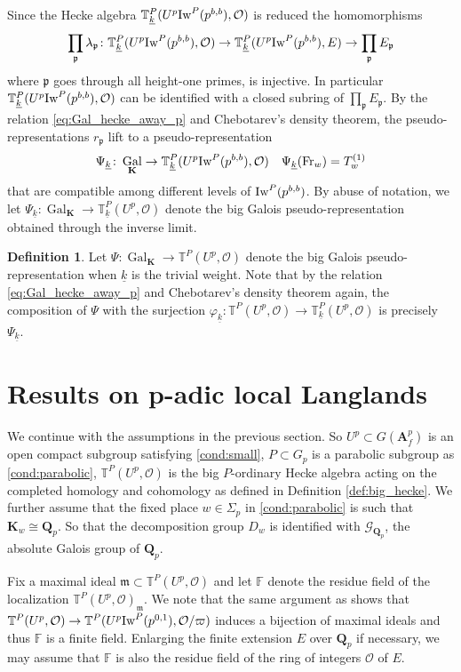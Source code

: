 \documentclass[leqno]{amsart}
\theoremstyle{definition}
\newtheorem{defn}[thm]{Definition}
\theoremstyle{remark}
\newcommand{\oo}{\mathcal{O}}
\newcommand{\fF}{\mathbb{F}} %
\newcommand{\Qp}{\mathbf{Q}_p}
\newcommand{\A}{\mathbf A}
\DeclareMathOperator{\Gal}{Gal}
\newcommand{\Fr}{\textnormal{Fr}} %
\newcommand{\fm}{\mathfrak{m}}
\newcommand{\fp}{\mathfrak{p}}
\newcommand{\Gp}{\mathcal{G}_{\Qp}} %
\newcommand{\K}{{\mathbf{K}}} %
\newcommand{\wt}[1]{\underline{ #1 }}
\newcommand{\Iw}{\textnormal{Iw}} %
\newcommand{\TT}{\mathbb{T}} %
\begin{document}
Since the Hecke algebra 
$\TT^P_{\wt{k}}(U^p\Iw^P(p^{b,b}),\oo)$
is reduced the homomorphisms
\[
	\prod_{\fp}\lambda_{\fp}\colon 
	\TT^P_{\wt{k}}(U^p\Iw^P(p^{b,b}),\oo)\to 
	\TT^P_{\wt{k}}(U^p\Iw^P(p^{b,b}),E)\to  
	\prod_{\fp}E_{\fp}
\]
where $\fp$ goes through all height-one primes,
is injective.
In particular $\TT^P_{\wt{k}}(U^p\Iw^P(p^{b,b}),\oo)$
can be identified with 
a closed subring of $\prod_{\fp}E_{\fp}$.
By the relation \eqref{eq:Gal_hecke_away_p}
and Chebotarev's density theorem,
the pseudo-representations  $r_{\fp}$
lift to a pseudo-representation
\begin{equation}\label{eq:pseudo_rep_finite}
	\Psi_{\wt{k}}\colon \Gal_{\K}
	\to \TT^P_{\wt{k}}(U^p\Iw^P(p^{b,b}),\oo)\quad
	\Psi_{\wt{k}}(\Fr_w)=T_w^{(1)}
\end{equation}
that are compatible among different levels of $\Iw^P(p^{b,b})$.
By abuse of notation,
we let 
$\Psi_{\wt{k}}\colon \Gal_{\K} \to \TT^P_{\wt{k}}(U^p,\oo)$
denote the big Galois pseudo-representation 
obtained through the inverse limit.

\begin{defn}\label{def:big_Gal}
Let $\Psi\colon \Gal_{\K}\to \TT^P(U^p,\oo)$	
denote the big Galois pseudo-representation
when $\wt{k}$ is the trivial weight.
Note that by the relation \eqref{eq:Gal_hecke_away_p}
and Chebotarev's density theorem again,
the composition of $\Psi$
with the surjection
$\varphi_{\wt{k}}\colon 
\TT^P(U^p,\oo)\to \TT^P_{\wt{k}}(U^p,\oo)$
is precisely  $\Psi_{\wt{k}}$.
\end{defn}


\section{Results on p-adic local Langlands}

We continue with the assumptions
in the previous section.
So $U^p\subset G(\A_f^p)$ is an
open compact subgroup satisfying \eqref{cond:small},
$P\subset G_p$ is a parabolic subgroup
as \eqref{cond:parabolic},
$\TT^P(U^p,\oo)$
is the big  $P$-ordinary Hecke algebra
acting on the completed homology 
and cohomology as defined in Definition \ref{def:big_hecke}.
We further assume that 
the fixed place $w\in \Sigma_p$
in \eqref{cond:parabolic}
is such that  $\K_w\cong \Qp$.
So that the decomposition group
$D_w$ is identified with
$\Gp$, the absolute Galois group of  $\Qp$.



Fix a maximal ideal $\fm\subset \TT^P(U^p,\oo)$
and let $\fF$ denote the residue field of the localization
$\TT^P(U^p,\oo)_{\fm}$.
We note that the same argument
as \cite[Prop 3.3.6]{pan} shows that
$\TT^P(U^p,\oo)\to \TT^P(U^p\Iw^P(p^{0,1}),\oo/\varpi)$ 
induces a bijection of maximal ideals
and thus $\fF$ is a finite field.
Enlarging the finite extension  $E$ over  $\Qp$
if necessary,
we may assume that  $\fF$ is also 
the residue field of the ring of integers  $\oo$ of  $E$.
\end{document}
